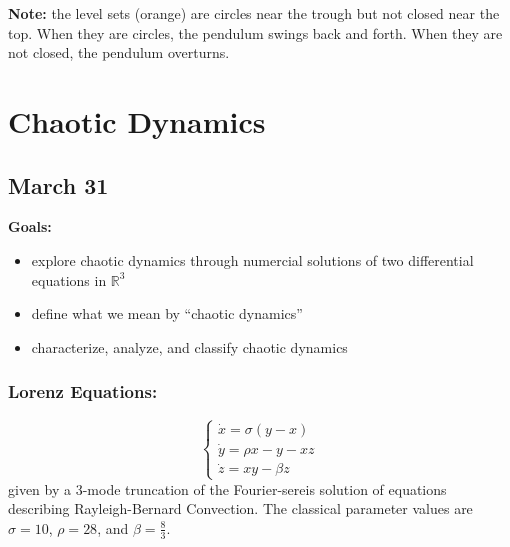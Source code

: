 \documentclass[12pt]{report}
\newcommand{\R}{\mathbb{R}}
\newcommand*{\tbf}[1]{\ifmmode\mathbf{#1}\else\textbf{#1}\fi}
\begin{document}
\begin{center}
\end{center}

\tbf{Note:} the level sets (orange) are circles near the trough but not closed near the top. When they are circles, the pendulum swings back and forth. When they are not closed, the pendulum overturns.

\chapter{Chaotic Dynamics}
\section{March 31}
\tbf{Goals:}
\begin{itemize}
    \item explore chaotic dynamics through numercial solutions of two differential equations in $\R^3$
    \item define what we mean by ``chaotic dynamics''
    \item characterize, analyze, and classify chaotic dynamics
\end{itemize}

\subsection{Lorenz Equations:}
\[\begin{cases}
        \dot x = \sigma(y-x)     \\
        \dot y = \rho x - y - xz \\
        \dot z = xy - \beta z
    \end{cases}\]
given by a 3-mode truncation of the Fourier-sereis solution of equations describing Rayleigh-Bernard Convection. The classical parameter values are $\sigma = 10$, $\rho = 28$, and $\beta = \frac{8}{3}$.
\end{document}
